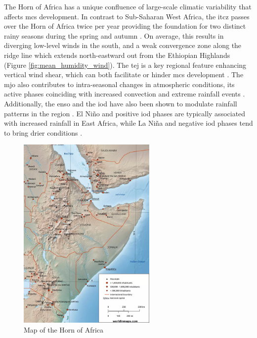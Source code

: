 The Horn of Africa has a unique confluence of large-scale climatic variability that affects \acrshort{mcs} development. In contrast to Sub-Saharan West Africa, the \acrfull{itcz} passes over the Horn of Africa twice per year providing the foundation for two distinct rainy seasons during the spring and autumn \citep{Palmer2023,Tefera2025}. On average, this results in diverging low-level winds in the south, and a weak convergence zone along the ridge line which extends north-eastward out from the Ethiopian Highlands (Figure \ref{fig:mean_humidity_wind}). The \acrfull{tej} is a key regional feature enhancing vertical wind shear, which can both facilitate or hinder \acrshort{mcs} development \citep{Farnsworth2011,Vashisht2021}. The \acrfull{mjo} also contributes to intra-seasonal changes in atmospheric conditions, its active phases coinciding with increased convection and extreme rainfall events \citep{Camberlin2019,Ochieng2023,Pohl2006}. Additionally, the \acrfull{enso} and the \acrfull{iod} have also been shown to modulate rainfall patterns in the region \citep{Dubache2019,Endris2019,Vashisht2021,Zaroug2014}. El Niño and positive \acrshort{iod} phases are typically associated with increased rainfall in East Africa, while La Niña and negative \acrshort{iod} phases tend to bring drier conditions \citep{Camberlin2019,Endris2019}.

\begin{figure}[ht]
    \centering
    \includegraphics[width=0.6\textwidth]{../figures/static/horn-of-africa-map-scaled.jpeg}
    \caption{Map of the Horn of Africa \citep{WorldInMaps2024}}
    \label{fig:horn-of-africa}
\end{figure}

